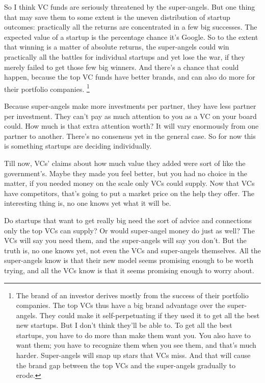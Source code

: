 \documentclass[12pt]{book}
\begin{document}
So I think VC funds are seriously threatened by the super-angels. But
one thing that may save them to some extent is the uneven distribution
of startup outcomes: practically all the returns are concentrated in a
few big successes. The expected value of a startup is the percentage
chance it's Google. So to the extent that winning is a matter of
absolute returns, the super-angels could win practically all the battles
for individual startups and yet lose the war, if they merely failed to
get those few big winners. And there's a chance that could happen,
because the top VC funds have better brands, and can also do more for
their portfolio companies. \footnote{The brand of an investor derives mostly from the success of
their portfolio companies. The top VCs thus have a big brand advantage
over the super-angels. They could make it self-perpetuating if they used
it to get all the best new startups. But I don't think they'll be able
to. To get all the best startups, you have to do more than make them
want you. You also have to want them; you have to recognize them when
you see them, and that's much harder. Super-angels will snap up stars
that VCs miss. And that will cause the brand gap between the top VCs and
the super-angels gradually to erode.}

Because super-angels make more investments per partner, they have less
partner per investment. They can't pay as much attention to you as a VC
on your board could. How much is that extra attention worth? It will
vary enormously from one partner to another. There's no consensus yet in
the general case. So for now this is something startups are deciding
individually.

Till now, VCs' claims about how much value they added were sort of like
the government's. Maybe they made you feel better, but you had no choice
in the matter, if you needed money on the scale only VCs could supply.
Now that VCs have competitors, that's going to put a market price on the
help they offer. The interesting thing is, no one knows yet what it will
be.

Do startups that want to get really big need the sort of advice and
connections only the top VCs can supply? Or would super-angel money do
just as well? The VCs will say you need them, and the super-angels will
say you don't. But the truth is, no one knows yet, not even the VCs and
super-angels themselves. All the super-angels know is that their new
model seems promising enough to be worth trying, and all the VCs know is
that it seems promising enough to worry about.
\end{document}

